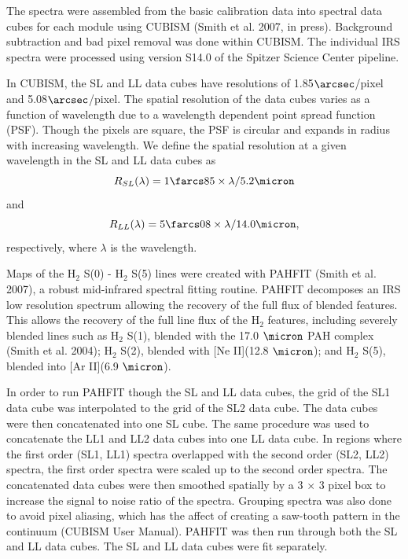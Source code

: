 \documentclass[manuscript]{aastex}
\begin{document}
The spectra were assembled from the basic calibration data into spectral data cubes for each module using CUBISM (Smith et al. 2007, in press).  Background subtraction and bad pixel removal was done within CUBISM.  The individual IRS spectra were processed using version S14.0 of the Spitzer Science Center pipeline.

In CUBISM, the SL and LL data cubes have resolutions of 1.85$\arcsec$/pixel and 5.08$\arcsec$/pixel.  The spatial resolution of the data cubes varies as a function of wavelength due to a wavelength dependent point spread function (PSF).  Though the pixels are square, the PSF is circular and expands in radius with increasing wavelength.  We define the spatial resolution at a given wavelength in the SL and LL data cubes as 
\begin{equation}
R_{SL}(\lambda) = 1\farcs85 \times \lambda/5.2 \micron
\end{equation}
and
\begin{equation}
R_{LL}(\lambda) = 5\farcs08 \times \lambda/14.0 \micron,
\end{equation}
respectively, where $\lambda$ is the wavelength.

Maps of the $\mathrm{H_2}$ S(0) - $\mathrm{H_2}$ S(5) lines were created with PAHFIT (Smith et al. 2007), a robust mid-infrared spectral fitting routine.  PAHFIT decomposes an IRS low resolution spectrum allowing the recovery of the full flux of blended features.  This allows the recovery of the full line flux of the $\mathrm{H_2}$ features, including severely blended lines such as $\mathrm{H_2}$ S(1), blended with the 17.0 $\micron$ PAH complex (Smith et al. 2004); $\mathrm{H_2}$ S(2), blended with [Ne II](12.8 $\micron$); and $\mathrm{H_2}$ S(5), blended into [Ar II](6.9 $\micron$). 

In order to run PAHFIT though the SL and LL data cubes, the grid of the SL1 data cube was interpolated to the grid of the SL2 data cube.  The data cubes were then concatenated into one SL cube.  The same procedure was used to concatenate the LL1 and LL2 data cubes into one LL data cube.  In regions where the first order (SL1, LL1) spectra overlapped with the second order (SL2, LL2) spectra, the first order spectra were scaled up to the second order spectra.  The concatenated data cubes were then smoothed spatially by a 3 $\times$ 3 pixel box to increase the signal to noise ratio of the spectra.  Grouping spectra was also done to avoid pixel aliasing, which has the affect of creating a saw-tooth pattern in the continuum (CUBISM User Manual).  PAHFIT was then run through both the SL and LL data cubes.  The SL and LL data cubes were fit separately.
\end{document}
